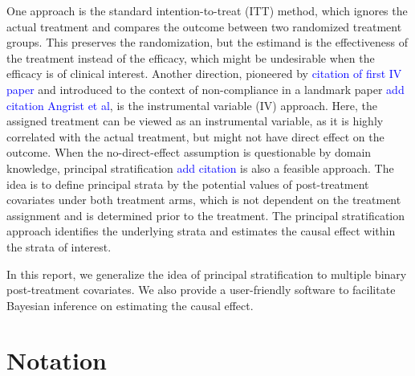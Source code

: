 \documentclass{article}
\begin{document}
One approach is the standard intention-to-treat (ITT) method, which ignores the actual treatment and compares the outcome between two randomized treatment groups. This preserves the randomization, but the estimand is the effectiveness of the treatment instead of the efficacy, which might be undesirable when the efficacy is of clinical interest. Another direction, pioneered by \textcolor{blue}{citation of first IV paper} and introduced to the context of non-compliance in a landmark paper \textcolor{blue}{add citation Angrist et al}, is the instrumental variable (IV) approach. Here, the assigned treatment can be viewed as an instrumental variable, as it is highly correlated with the actual treatment, but might not have direct effect on the outcome. When the no-direct-effect assumption is questionable by domain knowledge, principal stratification \textcolor{blue}{add citation} is also a feasible approach. The idea is to define principal strata by the potential values of post-treatment covariates under both treatment arms, which is not dependent on the treatment assignment and is determined prior to the treatment. The principal stratification approach identifies the underlying strata and estimates the causal effect within the strata of interest.

In this report, we generalize the idea of principal stratification to multiple binary post-treatment covariates. We also provide a user-friendly software to facilitate Bayesian inference on estimating the causal effect.

\section{Notation}
\end{document}
